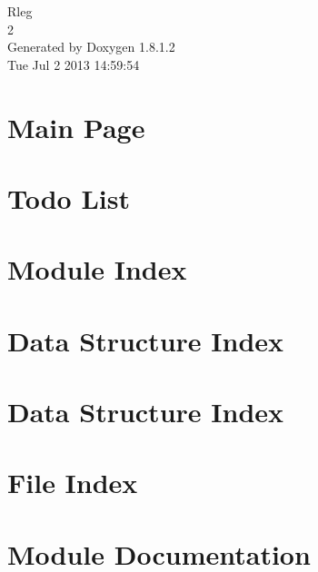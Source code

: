 \documentclass{book}
\begin{document}
\hypersetup{pageanchor=false,citecolor=blue}
\begin{titlepage}
\vspace*{7cm}
\begin{center}
{\Large Rleg \\[1ex]\large 2 }\\
\vspace*{1cm}
{\large Generated by Doxygen 1.8.1.2}\\
\vspace*{0.5cm}
{\small Tue Jul 2 2013 14:59:54}\\
\end{center}
\end{titlepage}
\clearemptydoublepage
{}
\tableofcontents
\clearemptydoublepage
{}
\hypersetup{pageanchor=true,citecolor=blue}
\chapter{Main Page}
\label{index}\hypertarget{index}{}
\chapter{Todo List}
\label{todo}
\hypertarget{todo}{}

\chapter{Module Index}

\chapter{Data Structure Index}

\chapter{Data Structure Index}

\chapter{File Index}

\chapter{Module Documentation}






\end{document}
